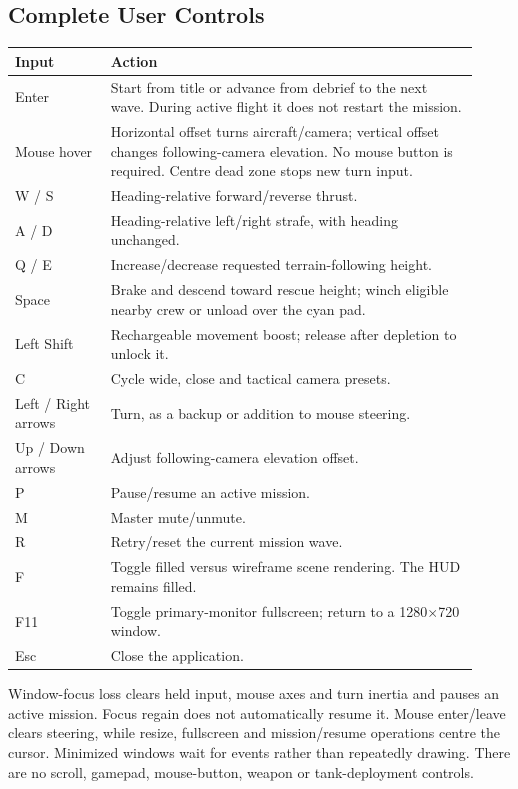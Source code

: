 \subsection{Complete User Controls}
\begin{longtable}{L{0.19\linewidth}L{0.73\linewidth}}
\toprule\textbf{Input}&\textbf{Action}\\\midrule\endhead
Enter & Start from title or advance from debrief to the next wave. During active flight it does not restart the mission.\\
Mouse hover & Horizontal offset turns aircraft/camera; vertical offset changes following-camera elevation. No mouse button is required. Centre dead zone stops new turn input.\\
W / S & Heading-relative forward/reverse thrust.\\
A / D & Heading-relative left/right strafe, with heading unchanged.\\
Q / E & Increase/decrease requested terrain-following height.\\
Space & Brake and descend toward rescue height; winch eligible nearby crew or unload over the cyan pad.\\
Left Shift & Rechargeable movement boost; release after depletion to unlock it.\\
C & Cycle wide, close and tactical camera presets.\\
Left / Right arrows & Turn, as a backup or addition to mouse steering.\\
Up / Down arrows & Adjust following-camera elevation offset.\\
P & Pause/resume an active mission.\\
M & Master mute/unmute.\\
R & Retry/reset the current mission wave.\\
F & Toggle filled versus wireframe scene rendering. The HUD remains filled.\\
F11 & Toggle primary-monitor fullscreen; return to a 1280$\times$720 window.\\*
Esc & Close the application.\\
\bottomrule
\end{longtable}
Window-focus loss clears held input, mouse axes and turn inertia and pauses an active mission. Focus regain does not automatically resume it. Mouse enter/leave clears steering, while resize, fullscreen and mission/resume operations centre the cursor. Minimized windows wait for events rather than repeatedly drawing. There are no scroll, gamepad, mouse-button, weapon or tank-deployment controls.

